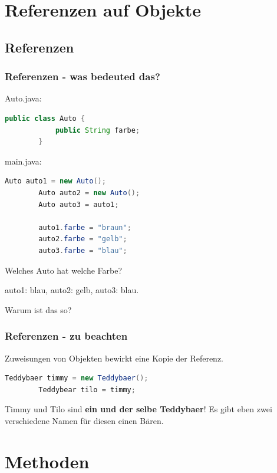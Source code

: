 \documentclass[18pt]{beamer}
\begin{document}

\section{Referenzen auf Objekte}
\subsection{Referenzen}
\begin{frame}[fragile]
	\frametitle{Referenzen - was bedeuted das?}
	Auto.java:
	\begin{lstlisting}[language=java]
		public class Auto {
			public String farbe;
		}
	\end{lstlisting}
	
	main.java:
	\begin{lstlisting}[language=java]
		Auto auto1 = new Auto();
		Auto auto2 = new Auto();
		Auto auto3 = auto1;
		
		auto1.farbe = "braun";
		auto2.farbe = "gelb";
		auto3.farbe = "blau";
	\end{lstlisting}
	Welches Auto hat welche Farbe?
	
	\pause	auto1: blau, auto2: gelb, auto3: blau.
	
	Warum ist das so?
	
\end{frame}


\begin{frame}[fragile]
	\frametitle{Referenzen - zu beachten}
	
	Zuweisungen von Objekten bewirkt eine Kopie der Referenz.
	
	
	\begin{lstlisting}[language=java]
		Teddybaer timmy = new Teddybaer();
		Teddybear tilo = timmy;
	\end{lstlisting}
	
	
	Timmy und Tilo sind \textbf{ein und der selbe Teddybaer}! Es gibt eben zwei verschiedene Namen für diesen einen Bären.
\end{frame}


\section{Methoden}
\end{document}

